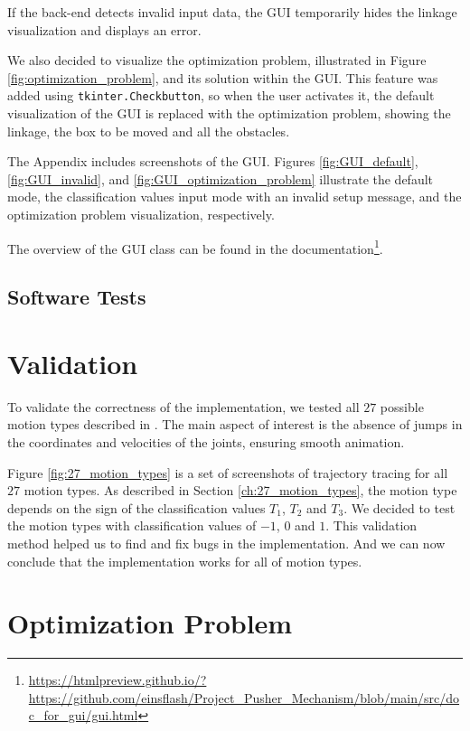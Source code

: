 \documentclass{article}
\begin{document}
If the back-end detects invalid input data, the GUI temporarily hides the linkage visualization and displays an error.

We also decided to visualize the optimization problem, illustrated in Figure \ref{fig:optimization_problem}, and its solution within the GUI. This feature was added using \texttt{tkinter.Checkbutton}, so when the user activates it, the default visualization of the GUI is replaced with the optimization problem, showing the linkage, the box to be moved and all the obstacles.

The Appendix includes screenshots of the GUI. Figures \ref{fig:GUI_default}, \ref{fig:GUI_invalid}, and \ref{fig:GUI_optimization_problem} illustrate the default mode, the classification values input mode with an invalid setup message, and the optimization problem visualization, respectively.

The overview of the GUI class can be found in the documentation\footnote{\url{https://htmlpreview.github.io/?https://github.com/einsflash/Project_Pusher_Mechanism/blob/main/src/doc_for_gui/gui.html}}.

\subsection{Software Tests}


\section{Validation}\label{ch:validation}

To validate the correctness of the implementation, we tested all $27$ possible motion types described in \cite{inproceedings}. The main aspect of interest is the absence of jumps in the coordinates and velocities of the joints, ensuring smooth animation. 

Figure \ref{fig:27_motion_types} is a set of screenshots of trajectory tracing for all $27$ motion types. As described in Section \ref{ch:27_motion_types}, the motion type depends on the sign of the classification values $T_1$, $T_2$ and $T_3$. We decided to test the motion types with classification values of $-1$, $0$ and $1$. This validation method helped us to find and fix bugs in the implementation. And we can now conclude that the implementation works for all of motion types.

\section{Optimization Problem}\label{ch:optimization-problem}
\end{document}
